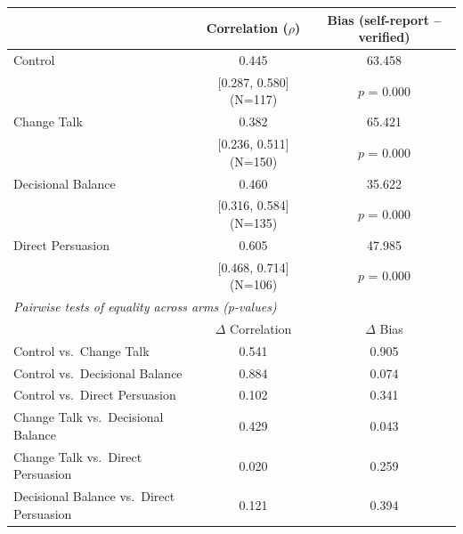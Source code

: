 \begin{tabular}{lcc}
\toprule
 & Correlation ($\rho$) & Bias (self-report -- verified) \\
\midrule
Control & 0.445 & 63.458 \\
 & [0.287, 0.580] (N=117) & $p$ = 0.000 \\
Change Talk & 0.382 & 65.421 \\
 & [0.236, 0.511] (N=150) & $p$ = 0.000 \\
Decisional Balance & 0.460 & 35.622 \\
 & [0.316, 0.584] (N=135) & $p$ = 0.000 \\
Direct Persuasion & 0.605 & 47.985 \\
 & [0.468, 0.714] (N=106) & $p$ = 0.000 \\
\midrule
\multicolumn{3}{l}{\textit{Pairwise tests of equality across arms (p-values)}} \\
 & $\Delta$ Correlation & $\Delta$ Bias \\
Control vs.\ Change Talk & 0.541 & 0.905 \\
Control vs.\ Decisional Balance & 0.884 & 0.074 \\
Control vs.\ Direct Persuasion & 0.102 & 0.341 \\
Change Talk vs.\ Decisional Balance & 0.429 & 0.043 \\
Change Talk vs.\ Direct Persuasion & 0.020 & 0.259 \\
Decisional Balance vs.\ Direct Persuasion & 0.121 & 0.394 \\
\bottomrule
\end{tabular}
